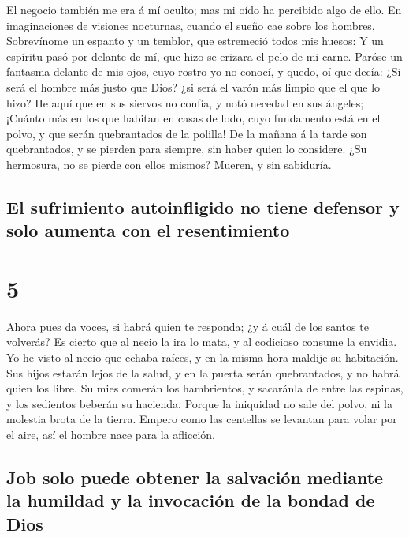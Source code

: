  El negocio también me era á mí oculto; mas mi oído ha
percibido algo de ello.  En imaginaciones de visiones
nocturnas, cuando el sueño cae sobre los hombres, 
Sobrevínome un espanto y un temblor, que estremeció todos mis huesos:
 Y un espíritu pasó por delante de mí, que hizo se
erizara el pelo de mi carne.  Paróse un fantasma delante
de mis ojos, cuyo rostro yo no conocí, y quedo, oí que decía:
 ¿Si será el hombre más justo que Dios? ¿si será el varón
más limpio que el que lo hizo?  He aquí que en sus
siervos no confía, y notó necedad en sus ángeles; 
¡Cuánto más en los que habitan en casas de lodo, cuyo fundamento está en
el polvo, y que serán quebrantados de la polilla!  De la
mañana á la tarde son quebrantados, y se pierden para siempre, sin haber
quien lo considere.  ¿Su hermosura, no se pierde con
ellos mismos? Mueren, y sin sabiduría.

\hypertarget{el-sufrimiento-autoinfligido-no-tiene-defensor-y-solo-aumenta-con-el-resentimiento}{%
\subsection{El sufrimiento autoinfligido no tiene defensor y solo
aumenta con el
resentimiento}\label{el-sufrimiento-autoinfligido-no-tiene-defensor-y-solo-aumenta-con-el-resentimiento}}

\hypertarget{section-4}{%
\section{5}\label{section-4}}

 Ahora pues da voces, si habrá quien te responda; ¿y á
cuál de los santos te volverás?  Es cierto que al necio la
ira lo mata, y al codicioso consume la envidia.  Yo he
visto al necio que echaba raíces, y en la misma hora maldije su
habitación.  Sus hijos estarán lejos de la salud, y en la
puerta serán quebrantados, y no habrá quien los libre.  Su
mies comerán los hambrientos, y sacaránla de entre las espinas, y los
sedientos beberán su hacienda.  Porque la iniquidad no
sale del polvo, ni la molestia brota de la tierra.  Empero
como las centellas se levantan para volar por el aire, así el hombre
nace para la aflicción.

\hypertarget{job-solo-puede-obtener-la-salvaciuxf3n-mediante-la-humildad-y-la-invocaciuxf3n-de-la-bondad-de-dios}{%
\subsection{Job solo puede obtener la salvación mediante la humildad y
la invocación de la bondad de
Dios}\label{job-solo-puede-obtener-la-salvaciuxf3n-mediante-la-humildad-y-la-invocaciuxf3n-de-la-bondad-de-dios}}

